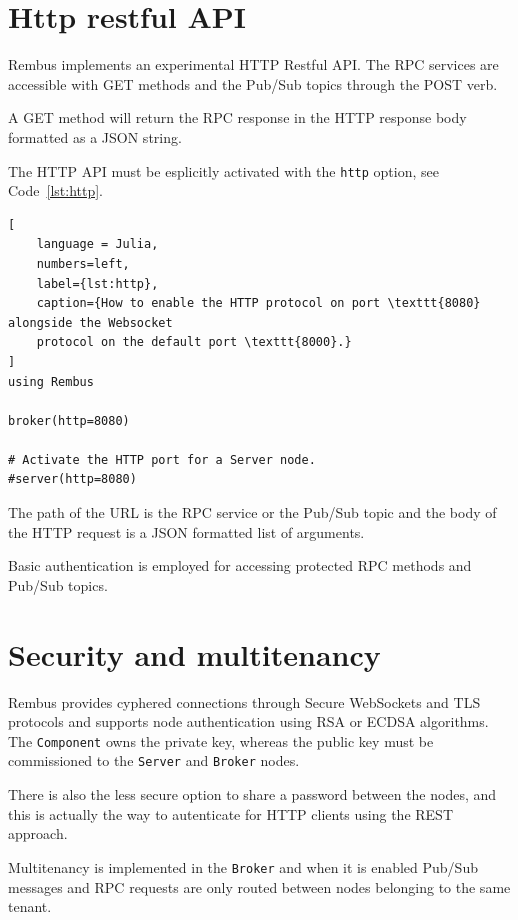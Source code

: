 \documentclass{juliacon}
\begin{document}
\section{Http restful API}\label{http-restful-api}

Rembus implements an experimental HTTP Restful API. The RPC services are
accessible with GET methods and the Pub/Sub topics through the POST
verb.
\vskip 6pt

A GET method will return the RPC response in the HTTP response body
formatted as a JSON string.
\vskip 6pt

The HTTP API must be esplicitly activated with the \texttt{http} option,
see Code~\ref{lst:http}.

\begin{lstlisting}[
    language = Julia, 
    numbers=left, 
    label={lst:http}, 
    caption={How to enable the HTTP protocol on port \texttt{8080} alongside the Websocket
    protocol on the default port \texttt{8000}.}
]
using Rembus

broker(http=8080)

# Activate the HTTP port for a Server node.
#server(http=8080)

\end{lstlisting}

The path of the URL is the RPC service or the Pub/Sub topic and the body
of the HTTP request is a JSON formatted list of arguments.
\vskip 6pt

Basic authentication is employed for accessing protected RPC methods and
Pub/Sub topics.

\section{Security and multitenancy}\label{security-and-multitenancy}

Rembus provides cyphered connections through Secure WebSockets and TLS
protocols and supports node authentication using RSA or ECDSA
algorithms. The \texttt{Component} owns the private key, whereas the public key
must be commissioned to the \texttt{Server} and \texttt{Broker} nodes.
\vskip 6pt

There is also the less secure option to share a password between the
nodes, and this is actually the way to autenticate for HTTP clients
using the REST approach.
\vskip 6pt

Multitenancy is implemented in the \texttt{Broker} and when it is enabled Pub/Sub messages
and RPC requests are only routed between nodes belonging to the same tenant. 
\vskip 6pt
\end{document}
